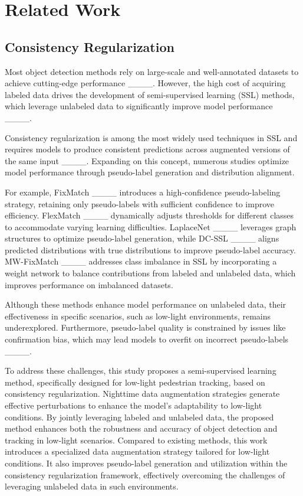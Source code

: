\section{Related Work}
\subsection{Consistency Regularization}
Most object detection methods rely on large-scale and well-annotated datasets to achieve cutting-edge performance ____. However, the high cost of acquiring labeled data drives the development of semi-supervised learning (SSL) methods, which leverage unlabeled data to significantly improve model performance ____.

Consistency regularization is among the most widely used techniques in SSL and requires models to produce consistent predictions across augmented versions of the same input ____. Expanding on this concept, numerous studies optimize model performance through pseudo-label generation and distribution alignment.

For example, FixMatch ____ introduces a high-confidence pseudo-labeling strategy, retaining only pseudo-labels with sufficient confidence to improve efficiency. FlexMatch ____ dynamically adjusts thresholds for different classes to accommodate varying learning difficulties. LaplaceNet ____ leverages graph structures to optimize pseudo-label generation, while DC-SSL ____ aligns predicted distributions with true distributions to improve pseudo-label accuracy. MW-FixMatch ____ addresses class imbalance in SSL by incorporating a weight network to balance contributions from labeled and unlabeled data, which improves performance on imbalanced datasets.

Although these methods enhance model performance on unlabeled data, their effectiveness in specific scenarios, such as low-light environments, remains underexplored. Furthermore, pseudo-label quality is constrained by issues like confirmation bias, which may lead models to overfit on incorrect pseudo-labels ____.

To address these challenges, this study proposes a semi-supervised learning method, specifically designed for low-light pedestrian tracking, based on consistency regularization. Nighttime data augmentation strategies generate effective perturbations to enhance the model’s adaptability to low-light conditions. By jointly leveraging labeled and unlabeled data, the proposed method enhances both the robustness and accuracy of object detection and tracking in low-light scenarios. Compared to existing methods, this work introduces a specialized data augmentation strategy tailored for low-light conditions. It also improves pseudo-label generation and utilization within the consistency regularization framework, effectively overcoming the challenges of leveraging unlabeled data in such environments.

